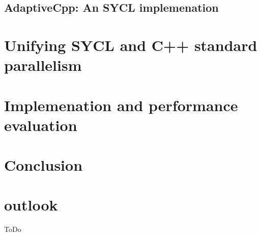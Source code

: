 \documentclass[manuscript,nonacm]{acmart}
\begin{document}
\subsection{AdaptiveCpp: An SYCL implemenation}

\section{Unifying SYCL and C++ standard parallelism}

\section{Implemenation and performance evaluation}

\section{Conclusion}


\section{outlook}
ToDo

\cite{alpay2021adaptivecpp}



 
\end{document}
